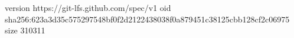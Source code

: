 version https://git-lfs.github.com/spec/v1
oid sha256:623a3d35c575297548bf0f2d2122438038f0a879451c38125cbb128cf2c06975
size 310311
